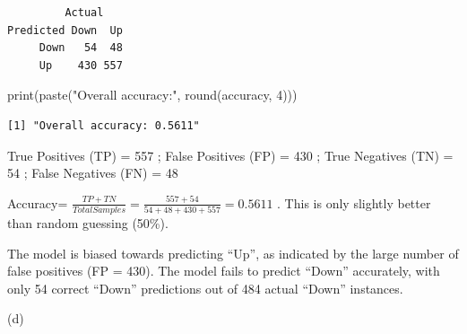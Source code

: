 \documentclass[
]{article}
\newenvironment{Shaded}{\begin{snugshade}}{\end{snugshade}}
\newcommand{\DecValTok}[1]{\textcolor[rgb]{0.68,0.00,0.00}{#1}}
\newcommand{\FunctionTok}[1]{\textcolor[rgb]{0.28,0.35,0.67}{#1}}
\newcommand{\NormalTok}[1]{\textcolor[rgb]{0.00,0.23,0.31}{#1}}
\newcommand{\StringTok}[1]{\textcolor[rgb]{0.13,0.47,0.30}{#1}}
\begin{document}
\begin{verbatim}
         Actual
Predicted Down  Up
     Down   54  48
     Up    430 557
\end{verbatim}

\begin{Shaded}
\begin{Highlighting}[]
\FunctionTok{print}\NormalTok{(}\FunctionTok{paste}\NormalTok{(}\StringTok{"Overall accuracy:"}\NormalTok{, }\FunctionTok{round}\NormalTok{(accuracy, }\DecValTok{4}\NormalTok{)))}
\end{Highlighting}
\end{Shaded}

\begin{verbatim}
[1] "Overall accuracy: 0.5611"
\end{verbatim}

True Positives (TP) = 557 ; False Positives (FP) = 430 ; True Negatives
(TN) = 54 ; False Negatives (FN) = 48

Accuracy=
\(\frac{TP+TN}{Total Samples} = \frac{557+54}{54+48+430+557}=0.5611\) .
This is only slightly better than random guessing (50\%).

The model is biased towards predicting ``Up'', as indicated by the large
number of false positives (FP = 430). The model fails to predict
``Down'' accurately, with only 54 correct ``Down'' predictions out of
484 actual ``Down'' instances.

(d)
\end{document}
